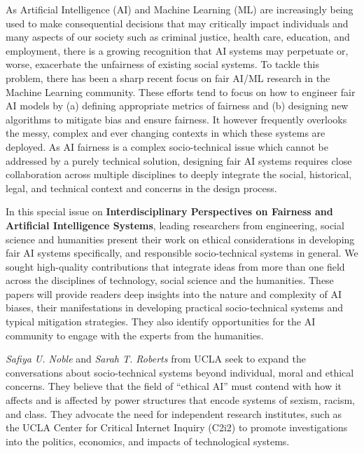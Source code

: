 \documentclass[11pt]{article}
\begin{document}
As Artificial Intelligence (AI) and Machine Learning (ML) are increasingly being used to make consequential  decisions that may critically impact individuals and many aspects of our society such as criminal justice, health care, education, and employment, there is a  growing recognition that AI systems may perpetuate or, worse, exacerbate the unfairness of existing social systems.  To tackle this problem, there has been a sharp recent focus on fair AI/ML research in the Machine Learning community.  These efforts tend to focus on how to engineer fair AI models by (a) defining appropriate metrics of fairness and (b) designing new algorithms to mitigate bias and ensure fairness. It however frequently overlooks the messy, complex and ever changing  contexts in which these systems are deployed. As AI fairness is a complex socio-technical issue which cannot be addressed by a purely technical solution,  designing fair AI systems requires close collaboration across multiple disciplines to  deeply integrate the social, historical, legal, and technical context and concerns in the design process.  

In this special issue on \textbf{Interdisciplinary Perspectives on Fairness and Artificial Intelligence Systems}, leading researchers from  engineering, social science and humanities present their work on ethical considerations in developing fair AI systems specifically, and responsible socio-technical systems in general. We sought high-quality contributions that integrate ideas from more than one field across the disciplines of technology, social science and the humanities. These papers will provide readers deep insights into the nature and complexity of AI biases, their manifestations in developing practical socio-technical systems and typical mitigation strategies.  They also identify  opportunities for the AI community to engage with the experts from the  humanities. %

\textit{Safiya U. Noble} and \textit{Sarah T. Roberts} from UCLA seek to expand the conversations about socio-technical systems beyond individual, moral and ethical concerns. They believe that the field of “ethical AI” must contend with how it affects and is affected by power structures that encode systems of sexism, racism, and class. They advocate the need for independent research institutes, such as the UCLA Center for Critical Internet Inquiry (C2i2) to promote investigations into the politics, economics, and impacts of technological systems. %
\end{document}
